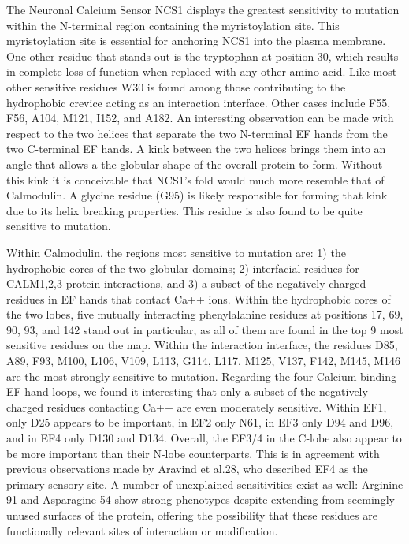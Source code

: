 The Neuronal Calcium Sensor NCS1 displays the greatest sensitivity to mutation within the N-terminal region containing the myristoylation site.  This myristoylation site is essential for anchoring NCS1 into the plasma membrane. One other residue that stands out is the tryptophan at position 30, which results in complete loss of function when replaced with any other amino acid. Like most other sensitive residues W30 is found among those contributing to the hydrophobic crevice acting as an interaction interface. Other cases include F55, F56, A104, M121, I152, and A182. An interesting observation can be made with respect to the two helices that separate the two N-terminal EF hands from the two C-terminal EF hands. A kink between the two helices brings them into an angle that allows a the globular shape of the overall protein to form. Without this kink it is conceivable that NCS1’s fold would much more resemble that of Calmodulin. A glycine residue (G95) is likely responsible for forming that kink due to its helix breaking properties. This residue is also found to be quite sensitive to mutation.

Within Calmodulin, the regions most sensitive to mutation are: 1) the hydrophobic cores of the two globular domains; 2) interfacial residues for CALM1,2,3 protein interactions, and 3) a subset of the negatively charged residues in EF hands that contact Ca++ ions. Within the hydrophobic cores of the two lobes, five mutually interacting phenylalanine residues at positions 17, 69, 90, 93, and 142 stand out in particular, as all of them are found in the top 9 most sensitive residues on the map. Within the interaction interface, the residues D85, A89, F93, M100, L106, V109, L113, G114, L117, M125, V137, F142, M145, M146 are the most strongly sensitive to mutation. Regarding the four Calcium-binding EF-hand loops, we found it interesting that only a subset of the negatively-charged residues contacting Ca++ are even moderately sensitive. Within EF1, only D25 appears to be important, in EF2 only N61, in EF3 only D94 and D96, and in EF4 only D130 and D134. Overall, the EF3/4 in the C-lobe also appear to be more important than their N-lobe counterparts. This is in agreement with previous observations made by Aravind et al.28, who described EF4 as the primary sensory site. A number of unexplained sensitivities exist as well: Arginine 91 and Asparagine 54 show strong phenotypes despite extending from seemingly unused surfaces of the protein, offering the possibility that these residues are functionally relevant sites of interaction or modification.


